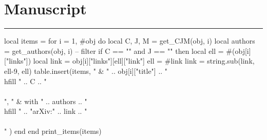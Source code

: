 \documentclass{article}
\begin{document}

\clearpage
\section*{Manuscript}
\vspace{-1em} \hrule \vspace{1em}

\begin{luacode}
  local items = {}
  for i = 1, #obj do
    local C, J, M = get_CJM(obj, i)
    local authors = get_authors(obj, i)
    -- filter
    if C == "" and J == "" then
      local ell = #(obj[i]["links"])
      local link = obj[i]["links"][ell]["link"]
      ell = #link
      link = string.sub(link, ell-9, ell)
      table.insert(items, {
        " & " .. obj[i]["title"] .. " \\hfill " .. C .. "\\\\",
        " & with " .. authors .. " \\hfill " .. "arXiv:" .. link .. "\\\\"
      })
    end
  end
  print_items(items)
\end{luacode}
\end{document}
